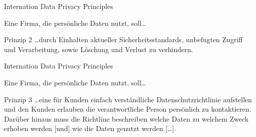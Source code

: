 \begin{frame}{Internation Data Privacy Principles}


    Eine Firma, die persönliche Daten nutzt, soll\dots

    \begin{block}{Prinzip 2 \cite{zankl_international_2014}}
        \dots durch Einhalten aktueller Sicherheitsstandards, unbefugten Zugriff und Verarbeitung, sowie Löschung und Verlust zu verhindern.
    \end{block}

\end{frame}

\begin{frame}{Internation Data Privacy Principles}


    Eine Firma, die persönliche Daten nutzt, soll\dots

    \begin{block}{Prinzip 3 \cite{zankl_international_2014}}
        \dots eine für Kunden einfach verständliche Datenschutzrichtlinie aufstellen und den Kunden erlauben die verantwortliche Person persönlich zu kontaktieren. Darüber hinaus muss die Richtline beschreiben welche Daten zu welchem Zweck erhoben werden [und] wie die Daten genutzt werden [\dots].
    \end{block}

\end{frame}

